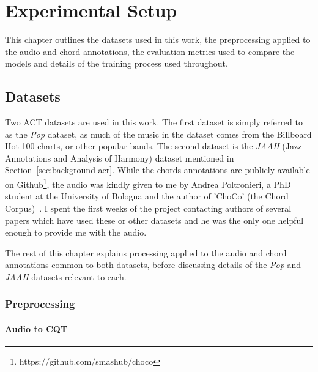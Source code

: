 \chapter{Experimental Setup}

This chapter outlines the datasets used in this work, the preprocessing applied to the audio and chord annotations, the evaluation metrics used to compare the models and details of the training process used throughout.

\section{Datasets}

Two ACT datasets are used in this work. The first dataset is simply referred to as the \emph{Pop} dataset, as much of the music in the dataset comes from the Billboard Hot 100 charts, or other popular bands. The second dataset is the \emph{JAAH} (Jazz Annotations and Analysis of Harmony) dataset mentioned in Section~\ref{sec:background-acr}. While the chords annotations are publicly available on Github\footnote{https://github.com/smashub/choco}, the audio was kindly given to me by Andrea Poltronieri, a PhD student at the University of Bologna and the author of 'ChoCo' (the Chord Corpus)~\citep{Choco}. I spent the first weeks of the project contacting authors of several papers which have used these or other datasets and he was the only one helpful enough to provide me with the audio.

The rest of this chapter explains processing applied to the audio and chord annotations common to both datasets, before discussing details of the \emph{Pop} and \emph{JAAH} datasets relevant to each.

\subsection{Preprocessing}

\subsubsection{Audio to CQT}\label{sec:audio-to-cqt}

